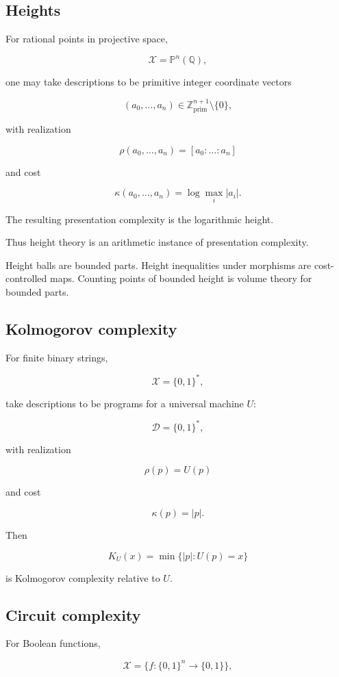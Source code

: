 \documentclass[11pt]{article}
\begin{document}
\subsection{Heights}

For rational points in projective space,

\[
\mathcal X=\mathbb P^n(\mathbb Q),
\]

one may take descriptions to be primitive integer coordinate vectors

\[
(a_0,\dots,a_n)\in \mathbb Z^{n+1}_{\mathrm{prim}}\setminus\{0\},
\]

with realization

\[
\rho(a_0,\dots,a_n)=[a_0:\dots:a_n]
\]

and cost

\[
\kappa(a_0,\dots,a_n)=\log\max_i|a_i|.
\]

The resulting presentation complexity is the logarithmic height.

Thus height theory is an arithmetic instance of presentation complexity.

Height balls are bounded parts. Height inequalities under morphisms are cost-controlled maps. Counting points of bounded height is volume theory for bounded parts.


\subsection{Kolmogorov complexity}

For finite binary strings,

\[
\mathcal X=\{0,1\}^*,
\]

take descriptions to be programs for a universal machine \(U\):

\[
\mathcal D=\{0,1\}^*,
\]

with realization

\[
\rho(p)=U(p)
\]

and cost

\[
\kappa(p)=|p|.
\]

Then

\[
K_U(x)=\min\{|p|:U(p)=x\}
\]

is Kolmogorov complexity relative to \(U\).


\subsection{Circuit complexity}

For Boolean functions,

\[
\mathcal X=\{f:\{0,1\}^n\to\{0,1\}\},
\]
\end{document}
